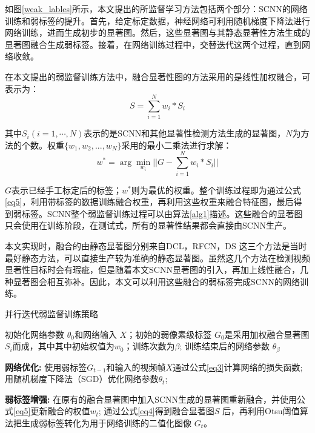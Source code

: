 如图\ref{weak_lables}所示，本文提出的所监督学习方法包括两个部分：SCNN的网络训练和弱标签的提升。首先，给定标定数据，神经网络可利用随机梯度下降法进行网络训练，进而生成初步的显著图。然后，这些显著图与其静态显著性方法生成的显著图融合生成弱标签。接着，在网络训练过程中，交替迭代这两个过程，直到网络收敛。

在本文提出的弱监督训练方法中，融合显著性图的方法采用的是线性加权融合，可表示为：
\begin{equation}
S = \sum_{i=1}^{N} w_i * S_i
\label{eq4}
\end{equation}

其中$S_i (i = 1,\cdots,N )$表示的是SCNN和其他显著性检测方法生成的显著图，$N$为方法的个数。权重$\{w_1, w_2, ..., w_N\}$采用的最小二乘法进行求解：
\begin{equation}
w^* = \arg\min_{w_i} ||G - \sum_{i=1}^{N} w_i * S_i||
\label{eq5}
\end{equation}

$G$表示已经手工标定后的标签；$w^*$则为最优的权重。整个训练过程即为通过公式\ref{eq5}，利用带标签的数据训练融合权重，再利用这些权重来融合特征图，最后得到弱标签。SCNN整个弱监督训练过程可以由算法\ref{alg1}描述。这些融合的显著图只会使用在训练阶段，在测试式，所有的显著性结果都会直接由SCNN生产。

本文实现时，融合的由静态显著图分别来自DCL\cite{li2016deep}，RFCN\cite{wang2016saliency}，DS\cite{li2016deepsaliency}
这三个方法是当时最好静态方法，可以直接生产较为准确的静态显著图。虽然这几个方法在检测视频显著性目标时会有瑕疵，但是随着本文SCNN显著图的引入，再加上线性融合，几种显著图会相互弥补。因此，本文可以利用这些融合的弱标签完成SCNN的网络训练。

\begin{algorithm}[tbp]
\caption{并行迭代弱监督训练策略}
\renewcommand{\algorithmicrequire}{\textbf{输入:}}
\renewcommand{\algorithmicensure}{\textbf{输出:}}

\newcommand\algorithmicestep{\textbf{网络优化:}}
\newcommand\ESTEP{\item[\algorithmicestep]}
\newcommand\algorithmicmstep{\textbf{弱标签增强:}}
\newcommand\MSTEP{\item[\algorithmicmstep]}

\label{alg1}
\begin{algorithmic}[1]

\REQUIRE 初始化网络参数 $\theta_0$和网络输入 $X$；初始的弱像素级标签 $G_0$是采用加权融合显著图$S_i$而成，其中其中初始权值为$w_0$；训练次数为$\beta$;
\ENSURE 训练结束后的网络参数 $\theta_\beta$
\ESTEP
\STATE 使用弱标签$G_{t-1}$和输入的视频帧$X$通过公式\ref{eq3}计算网络的损失函数;
\STATE 用随机梯度下降法（SGD）优化网络参数$\theta_t$;
\MSTEP
\STATE 在原有的融合显著图中加入SCNN生成的显著图重新融合，并使用公式\ref{eq5}更新融合的权值$w_t$;
\STATE 通过公式\ref{eq4}得到融合显著图$S$ 后，再利用Otsu阈值算法把生成弱标签转化为用于网络训练的二值化图像 $G_{t}$。
\ENDFOR
\end{algorithmic}
\end{algorithm}

